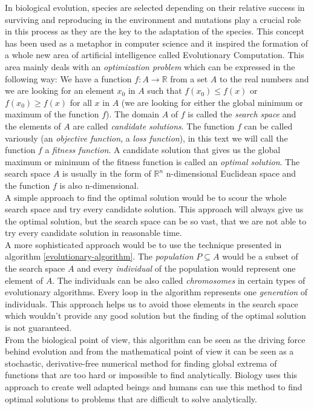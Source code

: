 In biological evolution, species are selected depending on their relative success in surviving and reproducing in the environment and mutations play a crucial role in this process as they are the key to the adaptation of the species. This concept has been used as a metaphor in computer science and it inspired the formation of a whole new area of artificial intelligence called Evolutionary Computation. This area mainly deals with an \textit{optimization problem} which can be expressed in the following way: We have a function $f: A \to \mathbb{R}$ from a set $A$ to the real numbers and we are looking for an element $x_0$ in $A$ such that $f(x_0) \leq f(x)$ or $f(x_0) \geq f(x)$ for all $x$ in $A$ (we are looking for either the global minimum or maximum of the function $f$). The domain $A$ of $f$ is called the \textit{search space} and the elements of $A$ are called \textit{candidate solutions}. The function $f$ can be called variously (an \textit{objective function}, a \textit{loss function}), in this text we will call the function $f$ a \textit{fitness function}. A candidate solution that gives us the global maximum or minimum of the fitness function is called an \textit{optimal solution}. The search space $A$ is usually in the form of $\mathbb{R}^n$ n-dimensional Euclidean space and the function $f$ is also n-dimensional.\\
A simple approach to find the optimal solution would be to scour the whole search space and try every candidate solution. This approach will always give us the optimal solution, but the search space can be so vast, that we are not able to try every candidate solution in reasonable time.\\
A more sophisticated approach would be to use the technique presented in algorithm \ref{evolutionary-algorithm}. The \textit{population} $P \subseteq A$ would be a subset of the search space $A$ and every \textit{individual} of the population would represent one element of $A$. The individuals can be also called \textit{chromosomes} in certain types of evolutionary algorithms. Every loop in the algorithm represents one \textit{generation} of individuals. This approach helps us to avoid those elements in the search space which wouldn't provide any good solution but the finding of the optimal solution is not guaranteed.\\
From the biological point of view, this algorithm can be seen as the driving force behind evolution and from the mathematical point of view it can be seen as a stochastic, derivative-free numerical method for finding global extrema of functions that are too hard or impossible to find analytically.
Biology uses this approach to create well adapted beings and humans can use this method to find optimal solutions to problems that are difficult to solve analytically.

